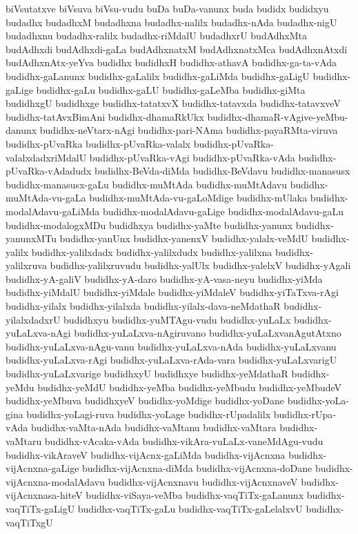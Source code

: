 {biVsutatxve
biVsuva
biVsu-vudu
buDa
buDa-vanunx
buda
budidx
budidxyu
budadhx
budadhxM
budadhxna
budadhx-nalilx
budadhx-nAda
budadhx-nigU
budadhxnu
budadhx-ralilx
budadhx-riMdalU
budadhxrU
budAdhxMta
budAdhxdi
budAdhxdi-gaLa
budAdhxnatxM
budAdhxnatxMca
budAdhxnAtxdi
budAdhxnAtx-yeYva
budidhx
budidhxH
budidhx-athavA
budidhx-ga-ta-vAda
budidhx-gaLanunx
budidhx-gaLalilx
budidhx-gaLiMda
budidhx-gaLigU
budidhx-gaLige
budidhx-gaLu
budidhx-gaLU
budidhx-gaLeMba
budidhx-giMta
budidhxgU
budidhxge
budidhx-tatatxvX
budidhx-tatavxda
budidhx-tatavxveV
budidhx-tatAvxBimAni
budidhx-dhamaRkUkx
budidhx-dhamaR-vAgive-yeMbu-danunx
budidhx-neVtarx-nAgi
budidhx-pari-NAma
budidhx-payaRMta-viruva
budidhx-pUvaRka
budidhx-pUvaRka-valalx
budidhx-pUvaRka-valalxdadxriMdalU
budidhx-pUvaRka-vAgi
budidhx-pUvaRka-vAda
budidhx-pUvaRka-vAdadudx
budidhx-BeVda-diMda
budidhx-BeVdavu
budidhx-manasusx
budidhx-manasusx-gaLu
budidhx-muMtAda
budidhx-muMtAdavu
budidhx-muMtAda-vu-gaLa
budidhx-muMtAda-vu-gaLoMdige
budidhx-mUlaka
budidhx-modalAdavu-gaLiMda
budidhx-modalAdavu-gaLige
budidhx-modalAdavu-gaLu
budidhx-modalogxMDu
budidhxya
budidhx-yaMte
budidhx-yanunx
budidhx-yanunxMTu
budidhx-yanUnx
budidhx-yanenxV
budidhx-yalalx-veMdU
budidhx-yalilx
budidhx-yalilxdadx
budidhx-yalilxdudx
budidhx-yalilxna
budidhx-yalilxruva
budidhx-yalilxruvudu
budidhx-yalUlx
budidhx-yalelxV
budidhx-yAgali
budidhx-yA-galiV
budidhx-yA-daro
budidhx-yA-vasa-neyu
budidhx-yiMda
budidhx-yiMdalU
budidhx-yiMdale
budidhx-yiMdaleV
budidhx-yiTaTxva-rAgi
budidhx-yilalx
budidhx-yilalxda
budidhx-yilalx-dava-neMdathaR
budidhx-yilalxdadxrU
budidhxyu
budidhx-yuMTAgu-vudu
budidhx-yuLaLx
budidhx-yuLaLxva-nAgi
budidhx-yuLaLxva-nAgiruvano
budidhx-yuLaLxvanAgutAtxno
budidhx-yuLaLxva-nAgu-vanu
budidhx-yuLaLxva-nAda
budidhx-yuLaLxvanu
budidhx-yuLaLxva-rAgi
budidhx-yuLaLxva-rAda-vara
budidhx-yuLaLxvarigU
budidhx-yuLaLxvarige
budidhxyU
budidhxye
budidhx-yeMdathaR
budidhx-yeMdu
budidhx-yeMdU
budidhx-yeMba
budidhx-yeMbudu
budidhx-yeMbudeV
budidhx-yeMbuva
budidhxyeV
budidhx-yoMdige
budidhx-yoDane
budidhx-yoLa-gina
budidhx-yoLagi-ruva
budidhx-yoLage
budidhx-rUpadalilx
budidhx-rUpa-vAda
budidhx-vaMta-nAda
budidhx-vaMtanu
budidhx-vaMtara
budidhx-vaMtaru
budidhx-vAcaka-vAda
budidhx-vikAra-vuLaLx-vaneMdAgu-vudu
budidhx-vikAraveV
budidhx-vijAcnx-gaLiMda
budidhx-vijAcnxna
budidhx-vijAcnxna-gaLige
budidhx-vijAcnxna-diMda
budidhx-vijAcnxna-doDane
budidhx-vijAcnxna-modalAdavu
budidhx-vijAcnxnavu
budidhx-vijAcnxnaveV
budidhx-vijAcnxnasa-hiteV
budidhx-viSaya-veMba
budidhx-vaqTiTx-gaLanunx
budidhx-vaqTiTx-gaLigU
budidhx-vaqTiTx-gaLu
budidhx-vaqTiTx-gaLelalxvU
budidhx-vaqTiTxgU
}
